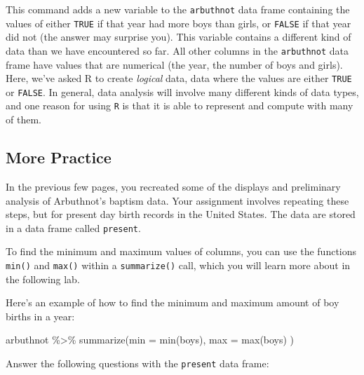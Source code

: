 \documentclass[
]{article}
\newenvironment{Shaded}{\begin{snugshade}}{\end{snugshade}}
\newcommand{\AttributeTok}[1]{\textcolor[rgb]{0.77,0.63,0.00}{#1}}
\newcommand{\FunctionTok}[1]{\textcolor[rgb]{0.00,0.00,0.00}{#1}}
\newcommand{\NormalTok}[1]{#1}
\newcommand{\SpecialCharTok}[1]{\textcolor[rgb]{0.00,0.00,0.00}{#1}}
\begin{document}
This command adds a new variable to the \texttt{arbuthnot} data frame containing the values of either \texttt{TRUE} if that year had more boys than girls, or \texttt{FALSE} if that year did not (the answer may surprise you). This variable contains a different kind of data than we have encountered so far. All other columns in the \texttt{arbuthnot} data frame have values that are numerical (the year, the number of boys and girls). Here, we've asked R to create \emph{logical} data, data where the values are either \texttt{TRUE} or \texttt{FALSE}. In general, data analysis will involve many different kinds of data types, and one reason for using \texttt{R} is that it is able to represent and compute with many of them.

\hypertarget{more-practice}{%
\subsection{More Practice}\label{more-practice}}

In the previous few pages, you recreated some of the displays and preliminary analysis of Arbuthnot's baptism data. Your assignment involves repeating these steps, but for present day birth records in the United States. The data are stored in a data frame called \texttt{present}.

To find the minimum and maximum values of columns, you can use the functions \texttt{min()} and \texttt{max()} within a \texttt{summarize()} call, which you will learn more about in the following lab.

Here's an example of how to find the minimum and maximum amount of boy births in a year:

\begin{Shaded}
\begin{Highlighting}[]
\NormalTok{arbuthnot }\SpecialCharTok{\%\textgreater{}\%}
  \FunctionTok{summarize}\NormalTok{(}\AttributeTok{min =} \FunctionTok{min}\NormalTok{(boys),}
            \AttributeTok{max =} \FunctionTok{max}\NormalTok{(boys)}
\NormalTok{            )}
\end{Highlighting}
\end{Shaded}

Answer the following questions with the \texttt{present} data frame:
\end{document}
